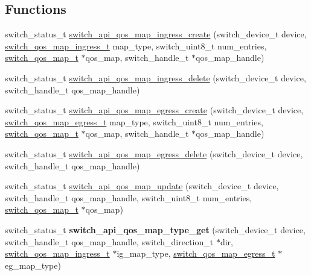 \subsection*{Functions}
\begin{DoxyCompactItemize}
\item 
switch\+\_\+status\+\_\+t \hyperlink{group__QOS_ga593f374b00999317c0eea308ade49a27}{switch\+\_\+api\+\_\+qos\+\_\+map\+\_\+ingress\+\_\+create} (switch\+\_\+device\+\_\+t device, \hyperlink{group__QOS_ga36b806f4d365145c9c3466c6db87383a}{switch\+\_\+qos\+\_\+map\+\_\+ingress\+\_\+t} map\+\_\+type, switch\+\_\+uint8\+\_\+t num\+\_\+entries, \hyperlink{group__QOS_gaa37a048e432bfdb7113ab1c1a28f52ff}{switch\+\_\+qos\+\_\+map\+\_\+t} $\ast$qos\+\_\+map, switch\+\_\+handle\+\_\+t $\ast$qos\+\_\+map\+\_\+handle)
\item 
switch\+\_\+status\+\_\+t \hyperlink{group__QOS_ga6614d6de1b15f3168a226e473dd93b19}{switch\+\_\+api\+\_\+qos\+\_\+map\+\_\+ingress\+\_\+delete} (switch\+\_\+device\+\_\+t device, switch\+\_\+handle\+\_\+t qos\+\_\+map\+\_\+handle)
\item 
switch\+\_\+status\+\_\+t \hyperlink{group__QOS_ga0aa5a7929c369d0094db5a5d74de9d93}{switch\+\_\+api\+\_\+qos\+\_\+map\+\_\+egress\+\_\+create} (switch\+\_\+device\+\_\+t device, \hyperlink{group__QOS_gae2c7461832eaa401343e50bc7e418b83}{switch\+\_\+qos\+\_\+map\+\_\+egress\+\_\+t} map\+\_\+type, switch\+\_\+uint8\+\_\+t num\+\_\+entries, \hyperlink{group__QOS_gaa37a048e432bfdb7113ab1c1a28f52ff}{switch\+\_\+qos\+\_\+map\+\_\+t} $\ast$qos\+\_\+map, switch\+\_\+handle\+\_\+t $\ast$qos\+\_\+map\+\_\+handle)
\item 
switch\+\_\+status\+\_\+t \hyperlink{group__QOS_ga50059db1534f6199d678695e0c50631c}{switch\+\_\+api\+\_\+qos\+\_\+map\+\_\+egress\+\_\+delete} (switch\+\_\+device\+\_\+t device, switch\+\_\+handle\+\_\+t qos\+\_\+map\+\_\+handle)
\item 
switch\+\_\+status\+\_\+t \hyperlink{group__QOS_gae09bfdbb0d3ffb9bfa6d2a2a5df2407f}{switch\+\_\+api\+\_\+qos\+\_\+map\+\_\+update} (switch\+\_\+device\+\_\+t device, switch\+\_\+handle\+\_\+t qos\+\_\+map\+\_\+handle, switch\+\_\+uint8\+\_\+t num\+\_\+entries, \hyperlink{group__QOS_gaa37a048e432bfdb7113ab1c1a28f52ff}{switch\+\_\+qos\+\_\+map\+\_\+t} $\ast$qos\+\_\+map)
\item 
\hypertarget{group__QOS_ga5b31065063ed01dfe616c16e48a9f684}{switch\+\_\+status\+\_\+t {\bfseries switch\+\_\+api\+\_\+qos\+\_\+map\+\_\+type\+\_\+get} (switch\+\_\+device\+\_\+t device, switch\+\_\+handle\+\_\+t qos\+\_\+map\+\_\+handle, switch\+\_\+direction\+\_\+t $\ast$dir, \hyperlink{group__QOS_ga36b806f4d365145c9c3466c6db87383a}{switch\+\_\+qos\+\_\+map\+\_\+ingress\+\_\+t} $\ast$ig\+\_\+map\+\_\+type, \hyperlink{group__QOS_gae2c7461832eaa401343e50bc7e418b83}{switch\+\_\+qos\+\_\+map\+\_\+egress\+\_\+t} $\ast$eg\+\_\+map\+\_\+type)}\label{group__QOS_ga5b31065063ed01dfe616c16e48a9f684}


\end{DoxyCompactItemize}

